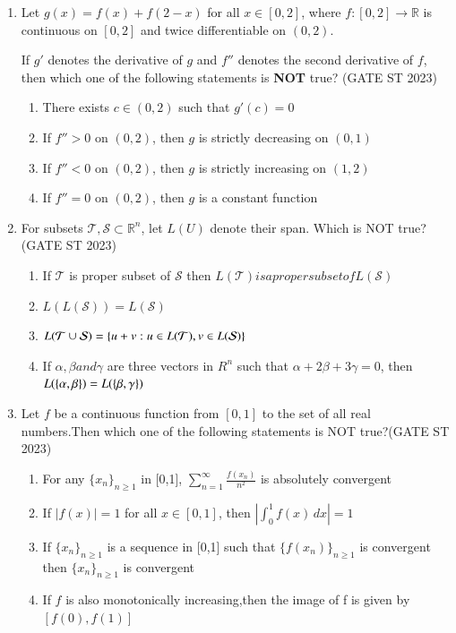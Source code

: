 \documentclass[journal]{IEEEtran}
\begin{document}
\begin{enumerate}[label=\textbf{Q.\arabic*.}, start=11, align=left, itemsep=2em]
\vspace{0.4cm}

\item Let $g(x) = f(x) + f(2 - x)$ for all $x \in [0, 2]$, where $f: [0, 2] \to \mathbb{R}$ is continuous on $[0, 2]$ and twice differentiable on $(0, 2)$.  

If $g'$ denotes the derivative of $g$ and $f''$ denotes the second derivative of $f$, then which one of the following statements is \textbf{NOT} true?  \hfill(GATE ST 2023)

\begin{enumerate}
    \item There exists $c \in (0, 2)$ such that $g'(c) = 0$
    \item If $f'' > 0$ on $(0, 2)$, then $g$ is strictly decreasing on $(0, 1)$
    \item If $f'' < 0$ on $(0, 2)$, then $g$ is strictly increasing on $(1, 2)$
    \item If $f'' = 0$ on $(0, 2)$, then $g$ is a constant function
\end{enumerate}


\item For subsets $\mathcal{T}, \mathcal{S} \subset \mathbb{R}^n$, let $L(U)$ denote their span. Which is NOT true?\hfill(GATE ST 2023)
\begin{enumerate}
\item If $\mathcal{T}$ is proper subset of $\mathcal{S}$ then $L(\mathcal{T}) is a proper subset of L(\mathcal{S})$
\item $L(L(\mathcal{S})) = L(\mathcal{S})$
\item $L(\mathcal{T} \cup \mathcal{S}) = \left\{u+v : u \in L(\mathcal{T}), v \in L(\mathcal{S})\right\}$
\item If $\alpha,\beta and \gamma$ are three vectors in $R^n$ such that $\alpha+2\beta+3\gamma=0$, then $L(\left\{\alpha,\beta\right\}) = L(\left\{\beta,\gamma\right\})$
\end{enumerate}

\item Let $f$ be a continuous function from $[0,1]$ to the set of all real numbers.Then which one of the following statements is NOT true?\hfill(GATE ST 2023)
\begin{enumerate}
\item For any $\{x_n\}_{n \ge 1}$ in [0,1], $\sum_{n=1}^\infty \frac{f(x_n)}{n^2}$ is absolutely convergent
\item If $|f(x)|=1$ for all $x\in [0,1]$, then $|\int_0^1 f(x)\,dx| = 1$
\item If $\{x_n\}_{n \ge 1}$ is a sequence in [0,1] such that $\{f(x_n)\}_{n \ge 1}$ is convergent then $\{x_n\}_{n \ge 1}$ is convergent
\item If $f$ is also monotonically increasing,then the image of f is given by $[f(0), f(1)]$
\end{enumerate}


\end{enumerate}
\end{document}
